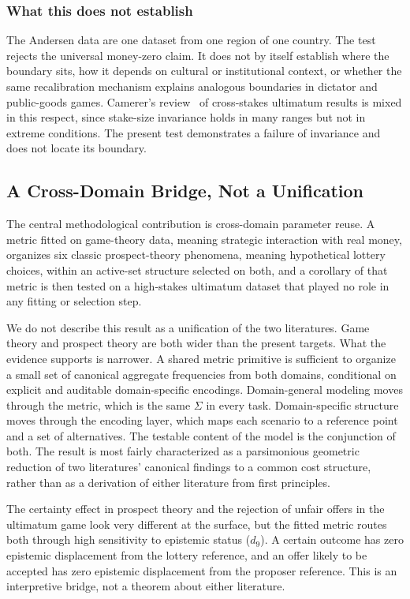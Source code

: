 \documentclass[journal]{IEEEtran}
\begin{document}
\subsubsection{What this does not establish}
The Andersen data are one dataset from one region of one country.
The test rejects the universal money-zero claim.
It does not by itself establish where the boundary sits, how it depends on cultural or institutional context, or whether the same recalibration mechanism explains analogous boundaries in dictator and public-goods games.
Camerer's review~\cite{camerer2003} of cross-stakes ultimatum results is mixed in this respect, since stake-size invariance holds in many ranges but not in extreme conditions.
The present test demonstrates a failure of invariance and does not locate its boundary.

\subsection{A Cross-Domain Bridge, Not a Unification}

The central methodological contribution is cross-domain parameter reuse.
A metric fitted on game-theory data, meaning strategic interaction with real money, organizes six classic prospect-theory phenomena, meaning hypothetical lottery choices, within an active-set structure selected on both, and a corollary of that metric is then tested on a high-stakes ultimatum dataset that played no role in any fitting or selection step.

We do not describe this result as a unification of the two literatures.
Game theory and prospect theory are both wider than the present targets.
What the evidence supports is narrower.
A shared metric primitive is sufficient to organize a small set of canonical aggregate frequencies from both domains, conditional on explicit and auditable domain-specific encodings.
Domain-general modeling moves through the metric, which is the same $\Sigma$ in every task.
Domain-specific structure moves through the encoding layer, which maps each scenario to a reference point and a set of alternatives.
The testable content of the model is the conjunction of both.
The result is most fairly characterized as a parsimonious geometric reduction of two literatures' canonical findings to a common cost structure, rather than as a derivation of either literature from first principles.

The certainty effect in prospect theory and the rejection of unfair offers in the ultimatum game look very different at the surface, but the fitted metric routes both through high sensitivity to epistemic status ($d_9$).
A certain outcome has zero epistemic displacement from the lottery reference, and an offer likely to be accepted has zero epistemic displacement from the proposer reference.
This is an interpretive bridge, not a theorem about either literature.
\end{document}
